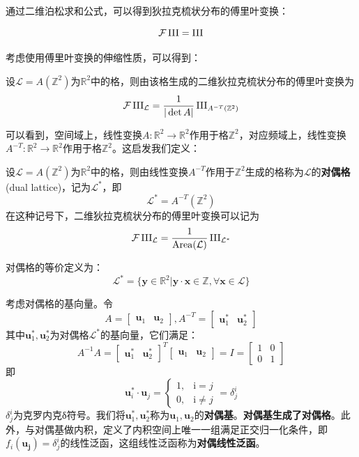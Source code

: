 通过二维泊松求和公式，可以得到狄拉克梳状分布的傅里叶变换：
\begin{proposition}[二维狄拉克梳状分布的傅里叶变换]
    \[\mathcal{F} \operatorname{III}=\operatorname{III}\]
\end{proposition}

考虑使用傅里叶变换的伸缩性质，可以得到：
\begin{proposition}
    设$\mathcal{L} =A(\mathbb{Z}^2)$为$\mathbb{R}^2$中的格，则由该格生成的二维狄拉克梳状分布的傅里叶变换为
    \[\mathcal{F} \operatorname{III}_{\mathcal{L} }=\frac{1}{|\det A|}\operatorname{III}_{A^{-T}(\mathbb{Z}^2)}\]
\end{proposition}

可以看到，空间域上，线性变换$A:\mathbb{R}^2\to\mathbb{R}^2$作用于格$\mathbb{Z}^2$，对应频域上，线性变换$A^{-T}:\mathbb{R}^2\to\mathbb{R}^2$作用于格$\mathbb{Z}^2$。这启发我们定义：
\begin{definition}[对偶格]
    设$\mathcal{L} =A(\mathbb{Z}^2)$为$\mathbb{R}^2$中的格，则由线性变换$A^{-T}$作用于$\mathbb{Z}^2$生成的格称为$\mathcal{L} $的\textbf{对偶格}(dual lattice)，记为$\mathcal{L} ^*$，即
    \[\mathcal{L} ^*=A^{-T}(\mathbb{Z}^2)\]
    在这种记号下，二维狄拉克梳状分布的傅里叶变换可以记为
    \[\mathcal{F} \operatorname{III}_{\mathcal{L} }=\frac{1}{\mathrm{Area}(\mathcal{L} )}\operatorname{III}_{\mathcal{L} ^*}\]

    对偶格的等价定义为：
    \[\mathcal{L} ^*=\{\mathbf{y}\in\mathbb{R}^2\left|\mathbf{y}\cdot \mathbf{x}\in\mathbb{Z},\forall \mathbf{x}\in\mathcal{L}\right. \}\]
\end{definition}
\begin{definition}[对偶基与对偶线性泛函]
    考虑对偶格的基向量。令
    \[A=\begin{bmatrix}
        \mathbf{u}_1&\mathbf{u}_2
    \end{bmatrix},A^{-T}=\begin{bmatrix}
        \mathbf{u}^*_1&\mathbf{u}^*_2
    \end{bmatrix}\]
    其中$\mathbf{u}^*_1,\mathbf{u}^*_2$为对偶格$\mathcal{L} ^*$的基向量，它们满足：
    \[A^{-1}A=\begin{bmatrix}
        \mathbf{u}^*_1&\mathbf{u}^*_2
    \end{bmatrix}^T\begin{bmatrix}
        \mathbf{u}_1&\mathbf{u}_2
    \end{bmatrix}=I=\begin{bmatrix}
        1&0\\
        0&1
    \end{bmatrix}\]
    即\[\mathbf{u}^*_i\cdot \mathbf{u}_j=\begin{cases}
    1,&\mathrm{i}=j\\
    0,&\mathrm{i}\neq j
    \end{cases}=\delta^i_{j}\]
    $\delta^i_{j}$为克罗内克δ符号。我们将$\mathbf{u}^*_1,\mathbf{u}^*_2$称为$\mathbf{u}_1,\mathbf{u}_2$的\textbf{对偶基}。\textbf{对偶基生成了对偶格}。此外，与对偶基做内积，定义了内积空间上唯一一组满足正交归一化条件，即$f_i(\mathbf{u_j})=\delta^i_{j}$的线性泛函，这组线性泛函称为\textbf{对偶线性泛函}。
\end{definition}

